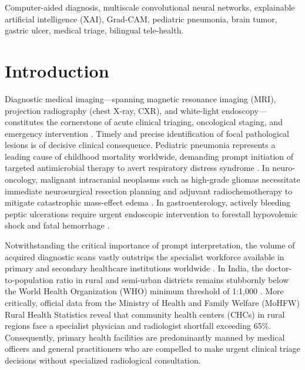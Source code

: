 \documentclass[conference]{IEEEtran}
\begin{document}
\begin{IEEEkeywords}
Computer-aided diagnosis, multiscale convolutional neural networks, explainable artificial intelligence (XAI), Grad-CAM, pediatric pneumonia, brain tumor, gastric ulcer, medical triage, bilingual tele-health.
\end{IEEEkeywords}

\section{Introduction}
Diagnostic medical imaging---spanning magnetic resonance imaging (MRI), projection radiography (chest X-ray, CXR), and white-light endoscopy---constitutes the cornerstone of acute clinical triaging, oncological staging, and emergency intervention \cite{kermany2018identifying, afshar2019capsule, sun2022deep}. Timely and precise identification of focal pathological lesions is of decisive clinical consequence. Pediatric pneumonia represents a leading cause of childhood mortality worldwide, demanding prompt initiation of targeted antimicrobial therapy to avert respiratory distress syndrome \cite{kermany2018identifying, sharma2023deep, ali2023pneumonia}. In neuro-oncology, malignant intracranial neoplasms such as high-grade gliomas necessitate immediate neurosurgical resection planning and adjuvant radiochemotherapy to mitigate catastrophic mass-effect edema \cite{afshar2019capsule, ismael2020brain, noreen2020deep}. In gastroenterology, actively bleeding peptic ulcerations require urgent endoscopic intervention to forestall hypovolemic shock and fatal hemorrhage \cite{sun2022deep, hatami2020deep, olimboyev2022gastro}.

Notwithstanding the critical importance of prompt interpretation, the volume of acquired diagnostic scans vastly outstrips the specialist workforce available in primary and secondary healthcare institutions worldwide \cite{sharma2023deep, noreen2020deep}. In India, the doctor-to-population ratio in rural and semi-urban districts remains stubbornly below the World Health Organization (WHO) minimum threshold of 1:1,000 \cite{who2020workforce}. More critically, official data from the Ministry of Health and Family Welfare (MoHFW) Rural Health Statistics \cite{mohfw2022rural} reveal that community health centers (CHCs) in rural regions face a specialist physician and radiologist shortfall exceeding 65\%. Consequently, primary health facilities are predominantly manned by medical officers and general practitioners who are compelled to make urgent clinical triage decisions without specialized radiological consultation.
\end{document}
